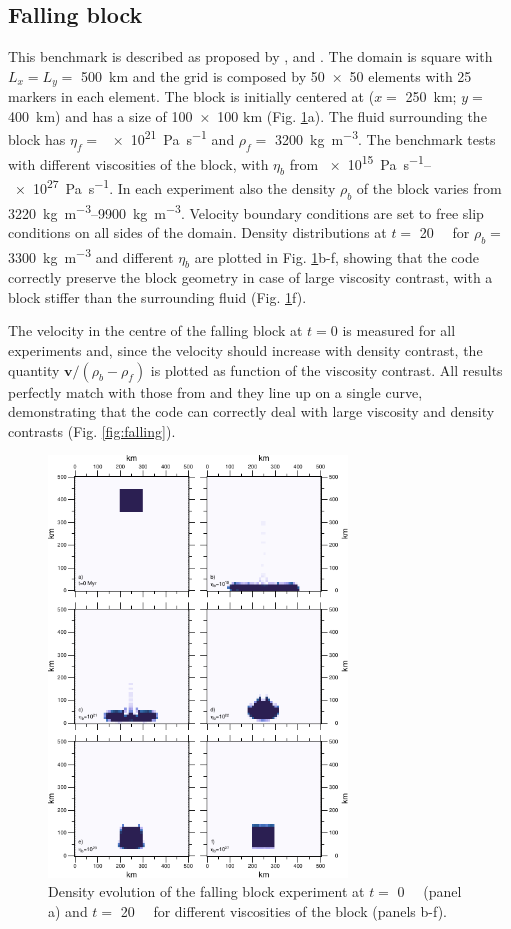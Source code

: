 \documentclass[hidelinks,11pt,a4paper]{article}
\begin{document}
\subsection{Falling block}\label{sec:block}
This benchmark is described as proposed by \citet{Gerya2003a}, \citet{Gerya2010b} and \citet{Thieulot2011}. The domain is square with $L_x=L_y=$ \SI{500}{\km} and the grid is composed by \num{50x50} elements with 25 markers in each element. The block is initially centered at ($x=$ \SI{250}{\km}; $y=$ \SI{400}{\km}) and has a size of \num{100x100} km (Fig. \ref{fig:block}a). The fluid surrounding the block has $\eta_f=$ \SI{e21}{\pascal\per\s} and $\rho_f=$ \SI{3200}{\kg\per\cubic\m}. The benchmark tests with different viscosities of the block, with $\eta_b$ from \SIrange{e15}{e27}{\pascal\per\s}. In each experiment also the density $\rho_b$ of the block varies from \SIrange{3220}{9900}{\kg\per\cubic\m}. Velocity boundary conditions are set to free slip conditions on all sides of the domain. Density distributions at $t=$ \SI{20}{\mega\year} for $\rho_b=$ \SI{3300}{\kg\per\cubic\m} and different $\eta_b$ are plotted in Fig. \ref{fig:block}b-f, showing that the code correctly preserve the block geometry in case of large viscosity contrast, with a block stiffer than the surrounding fluid (Fig. \ref{fig:block}f).

The velocity in the centre of the falling block at $t=0$ is measured for all experiments and, since the velocity should increase with density contrast, the quantity $\bm{v}/(\rho_b-\rho_f)$ is plotted as function of the viscosity contrast. All results perfectly match with those from \citet{Gerya2010b} and they line up on a single curve, demonstrating that the code can correctly deal with large viscosity and density contrasts (Fig. \ref{fig:falling}).

\begin{figure}
\noindent\includegraphics[width=300px]{./Figures/Block.pdf}
\centering
\caption{Density evolution of the falling block experiment at $t=$ \SI{0}{\mega\year} (panel a) and $t=$ \SI{20}{\mega\year} for different viscosities of the block (panels b-f).}
\label{fig:block}
\end{figure}
\end{document}
